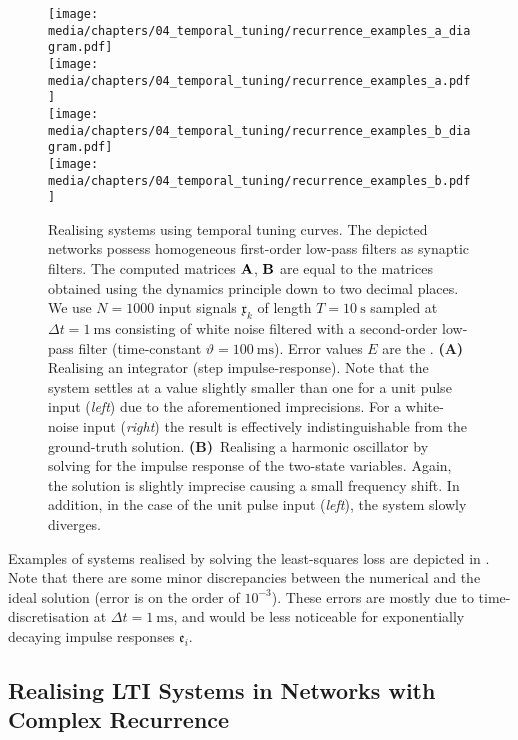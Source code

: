\begin{figure}[p]
	\centering
	\texttt{[image: media/chapters/04\_temporal\_tuning/recurrence\_examples\_a\_diagram.pdf]}\\[0.5em]
	\texttt{[image: media/chapters/04\_temporal\_tuning/recurrence\_examples\_a.pdf]}\\[1em]
	\texttt{[image: media/chapters/04\_temporal\_tuning/recurrence\_examples\_b\_diagram.pdf]}\\[0.5em]
	\texttt{[image: media/chapters/04\_temporal\_tuning/recurrence\_examples\_b.pdf]}%
	{\label{fig:recurrence_examples_1a}}%
	{\label{fig:recurrence_examples_1b}}%
	\caption[Realising LTI systems using temporal tuning curves]{
		Realising \LTI systems using temporal tuning curves.
		The depicted networks possess homogeneous first-order low-pass filters as synaptic filters.
		The computed matrices $\mathbf{A}$, $\mathbf{B}$ are equal to the matrices obtained using the \NEF dynamics principle down to two decimal places.
		We use $N = 1000$ input signals $\mathfrak{x}_k$ of length $T = \SI{10}{\second}$ sampled at $\Delta t = \SI{1}{\milli\second}$ consisting of white noise filtered with a second-order low-pass filter (time-constant $\vartheta = \SI{100}{\milli\second}$).
		Error values $E$ are the \NRMSE.
		\textbf{(A)} Realising an integrator (step impulse-response).
		Note that the system settles at a value slightly smaller than one for a unit pulse input (\emph{left}) due to the aforementioned imprecisions. For a white-noise input (\emph{right}) the result is effectively indistinguishable from the ground-truth solution.
		\textbf{(B)}~Realising a harmonic oscillator by solving for the impulse response of the two-state variables.
		Again, the solution is slightly imprecise causing a small frequency shift.
		In addition, in the case of the unit pulse input (\emph{left}), the system slowly diverges.
	}
	\label{fig:recurrence_examples_1}
\end{figure}

Examples of \LTI systems realised by solving the least-squares loss are depicted in .
Note that there are some minor discrepancies between the numerical and the ideal solution (error is on the order of $10^{-3}$).
These errors are mostly due to time-discretisation at $\Delta t = \SI{1}{\milli\second}$, and would be less noticeable for exponentially decaying impulse responses $\mathfrak{e}_i$.

\newpage

\subsection{Realising LTI Systems in Networks with Complex Recurrence}
\label{sec:lti_complex_networks}

